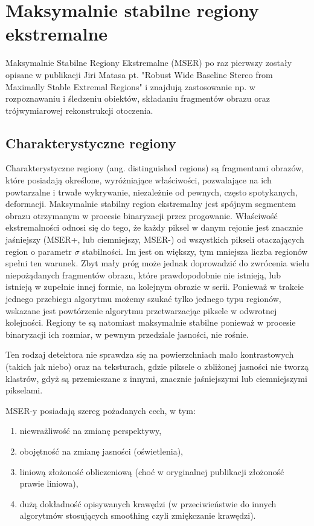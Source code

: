\chapter{Maksymalnie stabilne regiony ekstremalne}

Maksymalnie Stabilne Regiony Ekstremalne (MSER) po raz pierwszy zostały opisane
w publikacji Jiri Matasa pt. "Robust Wide Baseline Stereo from Maximally Stable
Extremal Regions" \cite{matas02} i znajdują zastosowanie np. w rozpoznawaniu i
śledzeniu obiektów, składaniu fragmentów obrazu oraz trójwymiarowej
rekonstrukcji otoczenia.

\section{Charakterystyczne regiony}

Charakterystyczne regiony (ang. distinguished regions) są fragmentami obrazów,
które posiadają określone, wyróżniające właściwości, pozwalające na ich
powtarzalne i trwałe wykrywanie, niezależnie od pewnych, często spotykanych,
deformacji. Maksymalnie stabilny region ekstremalny jest spójnym segmentem
obrazu otrzymanym w procesie binaryzacji przez progowanie. Właściwość
ekstremalności odnosi się do tego, że każdy piksel w danym rejonie jest
znacznie jaśniejszy (MSER+, lub ciemniejszy, MSER-) od wszystkich pikseli
otaczających region o parametr $\sigma$ stabilności. Im jest on większy, tym
mniejsza liczba regionów spełni ten warunek. Zbyt mały próg może jednak
doprowadzić do zwrócenia wielu niepożądanych fragmentów obrazu, które
prawdopodobnie nie istnieją, lub istnieją w zupełnie innej formie, na kolejnym
obrazie w serii.  Ponieważ w trakcie jednego przebiegu algorytmu możemy szukać
tylko jednego typu regionów, wskazane jest powtórzenie algorytmu przetwarzacjąc
piksele w odwrotnej kolejności. Regiony te są natomiast maksymalnie stabilne
ponieważ w procesie binaryzacji ich rozmiar, w pewnym przedziale jasności, nie
rośnie.

Ten rodzaj detektora nie sprawdza się na powierzchniach mało kontrastowych
(takich jak niebo) oraz na teksturach, gdzie piksele o zbliżonej jasności nie
tworzą klastrów, gdyż są przemieszane z innymi, znacznie jaśniejszymi lub
ciemniejszymi pikselami.

MSER-y posiadają szereg pożadanych cech, w tym:

\begin{enumerate} \item niewrażliwość na zmianę perspektywy, \item obojętność
    na zmianę jasności (oświetlenia), \item liniową złożoność obliczeniową
    (choć w oryginalnej publikacji złożoność prawie liniowa), \item dużą
    dokładność opisywanych krawędzi (w przeciwieństwie do innych algorytmów
    stosujących smoothing czyli zmiękczanie krawędzi).  \end{enumerate}

